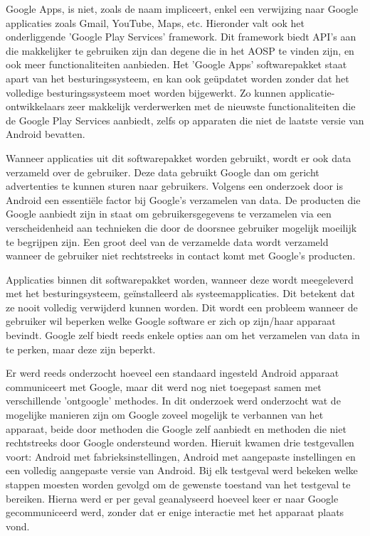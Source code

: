Google Apps, is niet, zoals de naam impliceert, enkel een verwijzing naar Google applicaties zoals Gmail, YouTube, Maps, etc. Hieronder valt ook het onderliggende 'Google Play Services' framework. Dit framework biedt API's aan die makkelijker te gebruiken zijn dan degene die in het AOSP te vinden zijn, en ook meer functionaliteiten aanbieden. Het 'Google Apps' softwarepakket staat apart van het besturingssysteem, en kan ook geüpdatet worden zonder dat het volledige besturingssysteem moet worden bijgewerkt. Zo kunnen applicatie-ontwikkelaars zeer makkelijk verderwerken met de nieuwste functionaliteiten die de Google Play Services aanbiedt, zelfs op apparaten die niet de laatste versie van Android bevatten.

Wanneer applicaties uit dit softwarepakket worden gebruikt, wordt er ook data verzameld over de gebruiker. Deze data gebruikt Google dan om gericht advertenties te kunnen sturen naar gebruikers. Volgens een onderzoek door \cite{schmidt_google-data-collection} is Android een essentiële factor bij Google's verzamelen van data. De producten die Google aanbiedt zijn in staat om gebruikersgegevens te verzamelen via een verscheidenheid aan technieken die door de doorsnee gebruiker mogelijk moeilijk te begrijpen zijn. Een groot deel van de verzamelde data wordt verzameld wanneer de gebruiker niet rechtstreeks in contact komt met Google's producten. 

Applicaties binnen dit softwarepakket worden, wanneer deze wordt meegeleverd met het besturingsysteem, geïnstalleerd als systeemapplicaties. Dit betekent dat ze nooit volledig verwijderd kunnen worden. Dit wordt een probleem wanneer de gebruiker wil beperken welke Google software er zich op zijn/haar apparaat bevindt. Google zelf biedt reeds enkele opties aan om het verzamelen van data in te perken, maar deze zijn beperkt.

Er werd reeds onderzocht hoeveel een standaard ingesteld Android apparaat communiceert met Google, maar dit werd nog niet toegepast samen met verschillende 'ontgoogle' methodes. In dit onderzoek werd onderzocht wat de mogelijke manieren zijn om Google zoveel mogelijk te verbannen van het apparaat, beide door methoden die Google zelf aanbiedt en methoden die niet rechtstreeks door Google ondersteund worden. Hieruit kwamen drie testgevallen voort: Android met fabrieksinstellingen, Android met aangepaste instellingen en een volledig aangepaste versie van Android. Bij elk testgeval werd bekeken welke stappen moesten worden gevolgd om de gewenste toestand van het testgeval te bereiken. Hierna werd er per geval geanalyseerd hoeveel keer er naar Google gecommuniceerd werd, zonder dat er enige interactie met het apparaat plaats vond. 

